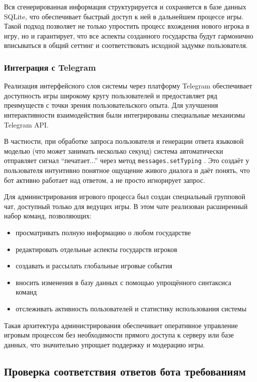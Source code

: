 Вся сгенерированная информация структурируется и сохраняется в базе данных SQLite, что обеспечивает быстрый доступ к ней в дальнейшем процессе игры. Такой подход позволяет не только упростить процесс вхождения нового игрока в игру, но и гарантирует, что все аспекты созданного государства будут гармонично вписываться в общий сеттинг и соответствовать исходной задумке пользователя.

\subsubsection{Интеграция с Telegram}

Реализация интерфейсного слоя системы через платформу Telegram обеспечивает доступность игры широкому кругу пользователей и предоставляет ряд преимуществ с точки зрения пользовательского опыта. Для улучшения интерактивности взаимодействия были интегрированы специальные механизмы Telegram API.

В частности, при обработке запроса пользователя и генерации ответа языковой моделью (что может занимать несколько секунд) система автоматически отправляет сигнал ``печатает...'' через метод \texttt{messages.setTyping} \cite{telegram_typing}. Это создаёт у пользователя интуитивно понятное ощущение живого диалога и даёт понять, что бот активно работает над ответом, а не просто игнорирует запрос.

Для администрирования игрового процесса был создан специальный групповой чат, доступный только для ведущих игры. В этом чате реализован расширенный набор команд, позволяющих:
\begin{itemize}
\item просматривать полную информацию о любом государстве
\item редактировать отдельные аспекты государств игроков
\item создавать и рассылать глобальные игровые события
\item вносить изменения в базу данных с помощью упрощённого синтаксиса команд
\item отслеживать активность пользователей и статистику использования системы
\end{itemize}

Такая архитектура администрирования обеспечивает оперативное управление игровым процессом без необходимости прямого доступа к серверу или базе данных, что значительно упрощает поддержку и модерацию игры.

\subsection{Проверка соответствия ответов бота требованиям}
